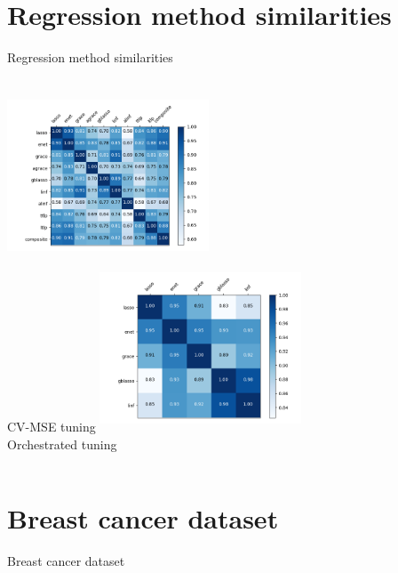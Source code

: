 \documentclass{beamer}
\begin{document}
\section{Regression method similarities}
\begin{frame}{Regression method similarities}
\begin{columns}[t]
	\centering
	\includegraphics[width=6cm,height=5cm]{cv_mse_similarities}\\
	CV-MSE tuning
	\centering
	\includegraphics[width=6cm,height=5cm]{orchestrated_similarities}\\
	Orchestrated tuning
\end{columns}
\end{frame}





\section{Breast cancer dataset}
\begin{frame}{Breast cancer dataset}
\end{frame}
\end{document}

